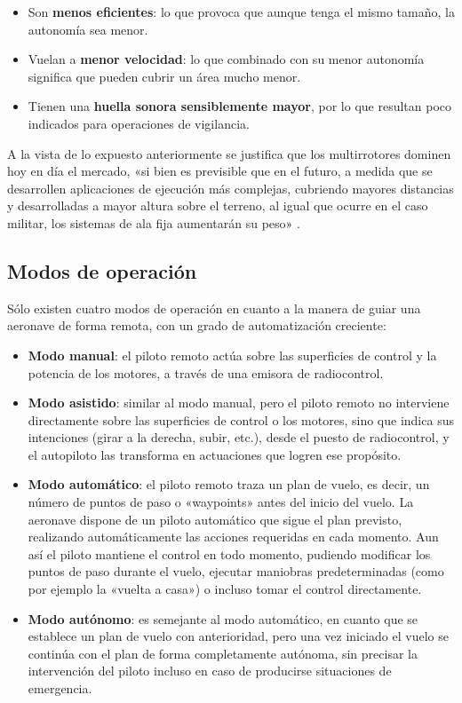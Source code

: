 \begin{itemize}
\item Son \textbf{menos eficientes}: lo que provoca que aunque tenga el mismo tamaño, la autonomía sea menor.
\item Vuelan a \textbf{menor velocidad}: lo que combinado con su menor autonomía significa que pueden cubrir un área mucho menor.
\item Tienen una \textbf{huella sonora sensiblemente mayor}, por lo que resultan poco indicados para operaciones de vigilancia.
\end{itemize}

A la vista de lo expuesto anteriormente se justifica que los multirrotores dominen hoy en día el mercado, 
«si bien es previsible que en el futuro, a medida que se desarrollen aplicaciones de ejecución más complejas, cubriendo 
mayores distancias y desarrolladas a mayor altura sobre el terreno, al igual que ocurre en el caso militar, los sistemas de ala 
fija aumentarán su peso» \cite{dron2}.

\subsection{Modos de operación}
\label{sec:mododeoperacion}

Sólo existen cuatro modos de operación en cuanto a la manera de guiar una aeronave de forma remota, 
con un grado de automatización creciente:

\begin{itemize}
\item \textbf{Modo manual}: el piloto remoto actúa sobre las superficies de control y la potencia de los motores, 
a través de una emisora de radiocontrol.
\item \textbf{Modo asistido}: similar al modo manual, pero el piloto remoto no interviene directamente sobre las superficies de 
control o los motores, sino que indica sus intenciones (girar a la derecha, subir, etc.), desde el puesto de radiocontrol, y el 
autopiloto las transforma en actuaciones que logren ese propósito.
\item \textbf{Modo automático}: el piloto remoto traza un plan de vuelo, es decir, un número de puntos de paso o «waypoints» antes del 
inicio del vuelo. La aeronave dispone de un piloto automático que sigue el plan previsto, realizando automáticamente las acciones 
requeridas en cada momento. Aun así el piloto mantiene el control en todo momento, pudiendo modificar los puntos de paso durante el vuelo, ejecutar maniobras predeterminadas (como por ejemplo la «vuelta a casa») o incluso tomar el control directamente.
\item \textbf{Modo autónomo}: es semejante al modo automático, en cuanto que se establece un plan de vuelo con anterioridad, 
pero una vez iniciado el vuelo se continúa con el plan de forma completamente autónoma, sin precisar la intervención del piloto 
incluso en caso de producirse situaciones de emergencia.
\end{itemize}

